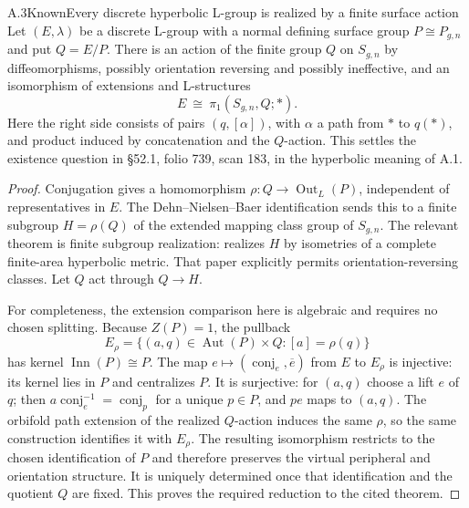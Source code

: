 \begin{statement}{A.3}{Known}{Every discrete hyperbolic L-group is realized by a finite surface action}
Let $(E,\lambda)$ be a discrete L-group with a normal defining surface
group $P\cong P_{g,n}$ and put $Q=E/P$. There is an action of the finite
group $Q$ on $S_{g,n}$ by diffeomorphisms, possibly orientation reversing
and possibly ineffective, and an isomorphism of extensions and
L-structures
\[
 E\ \cong\ \pi_1(S_{g,n},Q;*).
\]
Here the right side consists of pairs $(q,[\alpha])$, with $\alpha$ a
path from $*$ to $q(*)$, and product induced by concatenation and the
$Q$-action. This settles the existence question in \S52.1, folio 739,
scan 183, in the hyperbolic meaning of A.1.
\end{statement}
\begin{proof}
Conjugation gives a homomorphism
$\rho:Q\to\operatorname{Out}_L(P)$, independent of representatives
in $E$. The Dehn--Nielsen--Baer identification sends this to a finite
subgroup $H=\rho(Q)$ of the extended mapping class group of $S_{g,n}$.
The relevant theorem is finite subgroup realization:
\citet[Theorem 5 and its finite-type extension in \S4; Theorem 7]{Kerckhoff1983}
realizes $H$ by isometries of a complete finite-area hyperbolic metric.
That paper explicitly permits orientation-reversing classes. Let $Q$
act through $Q\to H$.

For completeness, the extension comparison here is algebraic and
requires no chosen splitting. Because $Z(P)=1$, the pullback
\[
 E_\rho=\{(a,q)\in\operatorname{Aut}(P)\times Q:
                  [a]=\rho(q)\}
\]
has kernel $\operatorname{Inn}(P)\cong P$. The map
$e\mapsto(\operatorname{conj}_e,\overline e)$ from $E$ to $E_\rho$
is injective: its kernel lies in $P$ and centralizes $P$. It is
surjective: for $(a,q)$ choose a lift $e$ of $q$; then
$a\operatorname{conj}_e^{-1}=\operatorname{conj}_p$ for a unique
$p\in P$, and $pe$ maps to $(a,q)$. The orbifold path extension
of the realized $Q$-action induces the same $\rho$, so the same
construction identifies it with $E_\rho$. The resulting isomorphism
restricts to the chosen identification of $P$ and therefore preserves
the virtual peripheral and orientation structure. It is uniquely
determined once that identification and the quotient $Q$ are fixed.
This proves the required reduction to the cited theorem.
\end{proof}

